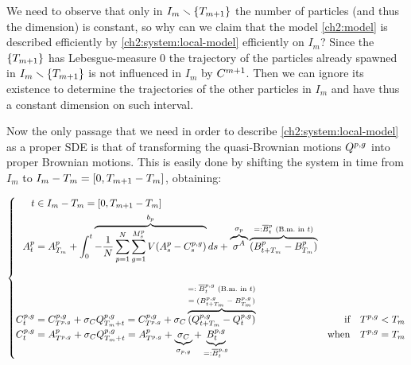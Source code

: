 \begin{remark}
We need to observe that only in $I_m \smallsetminus \{T_{m+1}\}$ the number of particles (and thus the dimension) is constant, so why can we claim that the model \ref{ch2:model} is described efficiently by \ref{ch2:system:local-model} efficiently on $I_m$?
Since the $\{T_{m+1}\}$ has Lebesgue-measure $0$ the trajectory of the particles already spawned in $I_m \smallsetminus \{T_{m+1}\}$ is not influenced in $I_m$ by $C^{m+1}$.
Then we can ignore its existence to determine the trajectories of the other particles in $I_m$ and have thus a constant dimension on such interval.
\end{remark}

Now the only passage that we need in order to describe \ref{ch2:system:local-model} as a proper SDE is that of transforming the quasi-Brownian motions $Q^{p,g}$ into proper Brownian motions.
This is easily done by shifting the system in time from $I_m$ to $I_m-T_m=[0, T_{m+1}-T_m]$, obtaining:

\begin{equation}
\left\{
\begin{aligned}
t &\in I_m - T_m = [0, T_{m+1}-T_m]
&
\\
A_t^p 
&= A_{T_m}^p
	+ \int_0^t 
		\overbrace{
			- \frac{1}{N} \sum _{p = 1}^{N} \sum_{g = 1}^{M_s^p} V(A_s^p - C_s^{p,g})
		}^{b_p}
	d s
	+ 
	\overbrace{\sigma^A}^{\sigma_p} 
	\overbrace{(B_{t + T_m}^p - B_{T_m}^p)}
		^{
			=:\overline{B}_t^p \text{ (\mbox{B.m.}\ in $t$)}
		}
&
\\
C_t^{p,g} 
&= C_{T^{p,g}}^{p,g} + \sigma_C Q_{T_m + t}^{p,g} = C_{T^{p,g}}^{p,g} + \sigma_C
	\overbrace{(Q_{t + T_m}^{p,g} - Q_t^{p,g})}
	^{
		\scriptsize{
			\begin{gathered}
				\\
				=:\overline{B}_t^{p,g} \text{ (\mbox{B.m.}\ in $t$)}
				\\
				= (B_{t + T_m}^{p,g} - B_{T_m}^{p,g})
			\end{gathered}
		}	
	}
&\text{if} \quad T^{p,g} < T_m
\\
C_t^{p,g}
&= A_{T^{p,g}}^p + \sigma_C Q_{T_m + t}^{p,g}
	= A_{T^{p,g}}^p + \underbrace{\sigma_C}_{\sigma_{p,g}} 
		+ \underbrace{B_t^{p,g}}_{=:\overline{B}_t^{p,g}}
&\text{when} \quad T^{p,g} = T_m
\end{aligned}
\right.
\end{equation}\label{ch2:system:local-model-shifted-to-0}


